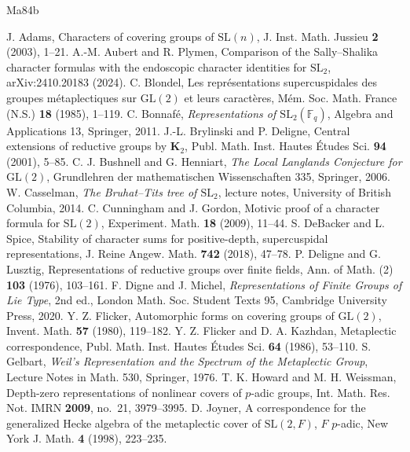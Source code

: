 \documentclass[12pt,letterpaper]{article}
\numberwithin{equation}{section}
\theoremstyle{definition}
\theoremstyle{remark}
\begin{document}
\begin{thebibliography}{Ma84b}
 J. Adams, Characters of covering groups of $\mathrm{SL}(n)$, J. Inst. Math. Jussieu \textbf{2} (2003), 1--21.
 A.-M. Aubert and R. Plymen, Comparison of the Sally--Shalika character formulas with the endoscopic character identities for $\mathrm{SL}_2$, arXiv:2410.20183 (2024).
 C. Blondel, Les repr\'esentations supercuspidales des groupes m\'etaplectiques sur $\mathrm{GL}(2)$ et leurs caract\`eres, M\'em. Soc. Math. France (N.S.) \textbf{18} (1985), 1--119.
 C. Bonnaf\'e, \emph{Representations of $\mathrm{SL}_2(\mathbb F_q)$}, Algebra and Applications 13, Springer, 2011.
 J.-L. Brylinski and P. Deligne, Central extensions of reductive groups by $\mathbf K_2$, Publ. Math. Inst. Hautes \'Etudes Sci. \textbf{94} (2001), 5--85.
 C. J. Bushnell and G. Henniart, \emph{The Local Langlands Conjecture for $\mathrm{GL}(2)$}, Grundlehren der mathematischen Wissenschaften 335, Springer, 2006.
 W. Casselman, \emph{The Bruhat--Tits tree of $\mathrm{SL}_2$}, lecture notes, University of British Columbia, 2014.
 C. Cunningham and J. Gordon, Motivic proof of a character formula for $\mathrm{SL}(2)$, Experiment. Math. \textbf{18} (2009), 11--44.
 S. DeBacker and L. Spice, Stability of character sums for positive-depth, supercuspidal representations, J. Reine Angew. Math. \textbf{742} (2018), 47--78.
 P. Deligne and G. Lusztig, Representations of reductive groups over finite fields, Ann. of Math. (2) \textbf{103} (1976), 103--161.
 F. Digne and J. Michel, \emph{Representations of Finite Groups of Lie Type}, 2nd ed., London Math. Soc. Student Texts 95, Cambridge University Press, 2020.
 Y. Z. Flicker, Automorphic forms on covering groups of $\mathrm{GL}(2)$, Invent. Math. \textbf{57} (1980), 119--182.
 Y. Z. Flicker and D. A. Kazhdan, Metaplectic correspondence, Publ. Math. Inst. Hautes \'Etudes Sci. \textbf{64} (1986), 53--110.
 S. Gelbart, \emph{Weil's Representation and the Spectrum of the Metaplectic Group}, Lecture Notes in Math. 530, Springer, 1976.
 T. K. Howard and M. H. Weissman, Depth-zero representations of nonlinear covers of $p$-adic groups, Int. Math. Res. Not. IMRN \textbf{2009}, no.~21, 3979--3995.
 D. Joyner, A correspondence for the generalized Hecke algebra of the metaplectic cover of $\mathrm{SL}(2,F)$, $F$ $p$-adic, New York J. Math. \textbf{4} (1998), 223--235.

\end{thebibliography}
\end{document}
